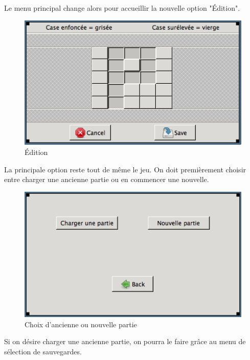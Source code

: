 \documentclass[11pt]{article}
\begin{document}
	\FloatBarrier
		
	Le menu principal change alors pour accueillir la nouvelle option "Édition".
	
		\begin{figure}[!ht]
			\centering
			\includegraphics[]{./IHM/editeur.png}
			\caption{Édition}
		\end{figure}
		
	\FloatBarrier
		
	La principale option reste tout de même le jeu. On doit premièrement choisir entre charger une ancienne partie ou en commencer une nouvelle.
	
		\begin{figure}[!ht]
			\centering
			\includegraphics[]{./IHM/choix_partie.png}
			\caption{Choix d'ancienne ou nouvelle partie}
		\end{figure}
		
	\FloatBarrier
		
	Si on désire charger une ancienne partie, on pourra le faire grâce au menu de sélection de sauvegardes.
	
\end{document}
